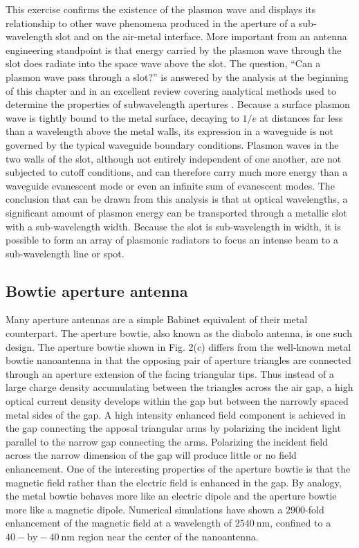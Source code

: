 \documentclass[11pt]{article}
\begin{document}

This exercise confirms the existence of the plasmon wave and displays its relationship to other wave phenomena produced in the aperture of a sub-wavelength slot and on the air-metal interface. More important from an antenna engineering standpoint is that energy carried by the plasmon wave through the slot does radiate into the space wave above the slot. The question, ``Can a plasmon wave pass through a slot?'' is answered by the analysis at the beginning of this chapter and in an excellent review covering analytical methods used to determine the properties of subwavelength apertures \cite{Garcia-Vidal2010}. Because a surface plasmon wave is tightly bound to the metal surface, decaying to $1/e$ at distances far less than a wavelength above the metal walls, its expression in a waveguide is not governed by the typical waveguide boundary conditions. Plasmon waves in the two walls of the slot, although not entirely independent of one another, are not subjected to cutoff conditions, and can therefore carry much more energy than a waveguide evanescent mode or even an infinite sum of evanescent modes. The conclusion that can be drawn from this analysis is that at optical wavelengths, a significant amount of plasmon energy can be transported through a metallic slot with a sub-wavelength width. Because the slot is sub-wavelength in width, it is possible to form an array of plasmonic radiators to focus an intense beam to a sub-wavelength line or spot.
\subsection{Bowtie aperture antenna}
%
Many aperture antennas are a simple Babinet equivalent of their metal counterpart. The aperture bowtie, also known as the diabolo antenna, is one such design. The aperture bowtie shown in Fig. 2(c) differs from the well-known metal bowtie nanoantenna in that the opposing pair of aperture triangles are connected through an aperture extension of the facing triangular tips. Thus instead of a large charge density accumulating between the triangles across the air gap, a high optical current density develops within the gap but between the narrowly spaced metal sides of the gap.  A high intensity enhanced field component is achieved in the gap connecting the apposal triangular arms by polarizing the incident light parallel to the narrow gap connecting the arms. Polarizing the incident field across the narrow dimension of the gap will produce little or no field enhancement.  One of the interesting properties of the aperture bowtie is that the magnetic field rather than the electric field is enhanced in the gap. By analogy, the metal bowtie behaves more like an electric dipole and the aperture bowtie more like a magnetic dipole. Numerical
simulations have shown a $2900$-fold enhancement of the magnetic field at a wavelength of $2540~\text{nm}$, confined to a $40-\text{by}-40~\text{nm}$ region near the center of the nanoantenna.
\end{document}
